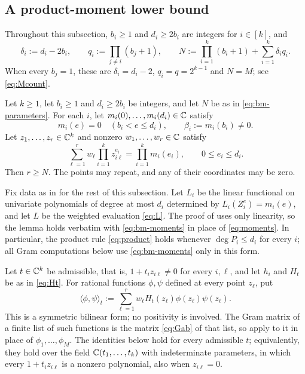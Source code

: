 \subsection{A product-moment lower bound}
Throughout this subsection, $b_i\ge1$ and $d_i\ge2b_i$ are integers
for $i\in[k]$, and
\begin{equation}\label{eq:bm-parameters}
\delta_i:=d_i-2b_i,\qquad
q_i:=\prod_{j\ne i}(b_j+1),\qquad
N:=\prod_{i=1}^k(b_i+1)+\sum_{i=1}^k\delta_iq_i .
\end{equation}
When every $b_j=1$, these are $\delta_i=d_i-2$, $q_i=q=2^{k-1}$ and
$N=M$; see \eqref{eq:Mcount}.

\begin{theorem}\label{thm:pm}
Let $k\ge1$, let $b_i\ge1$ and $d_i\ge2b_i$ be integers, and let $N$
be as in \eqref{eq:bm-parameters}. For each $i$, let
$m_i(0),\ldots,m_i(d_i)\in\mathbb C$ satisfy
\begin{equation}\label{eq:bm-truncation}
m_i(e)=0\quad(b_i<e\le d_i),
\qquad
\beta_i:=m_i(b_i)\ne0 .
\end{equation}
Let $z_1,\ldots,z_r\in\mathbb C^k$ and nonzero $w_1,\ldots,w_r\in\mathbb C$ satisfy
\begin{equation}\label{eq:bm-moments}
\sum_{\ell=1}^r w_\ell\prod_{i=1}^k z_{i\ell}^{e_i}
=\prod_{i=1}^k m_i(e_i),
\qquad 0\le e_i\le d_i .
\end{equation}
Then $r\ge N$. The points may repeat, and any of their coordinates may
be zero.
\end{theorem}

Fix data as in  for the rest of this subsection. Let
$L_i$ be the linear functional on univariate polynomials of degree at
most $d_i$ determined by $L_i(Z_i^e)=m_i(e)$, and let $L$ be the
weighted evaluation \eqref{eq:L}. The proof of 
uses only linearity, so the lemma holds verbatim with
\eqref{eq:bm-moments} in place of \eqref{eq:moments}. In particular,
the product rule \eqref{eq:product} holds whenever $\deg P_i\le d_i$
for every $i$; all Gram computations below use \eqref{eq:bm-moments}
only in this form.

Let $t\in\mathbb C^k$ be admissible, that is, $1+t_iz_{i\ell}\ne0$ for every
$i,\ell$, and let $h_i$ and $H_t$ be as in \eqref{eq:Ht}. For rational
functions $\phi,\psi$ defined at every point $z_\ell$, put
\begin{equation}\label{eq:bm-pairing}
\langle\phi,\psi\rangle_t
:=\sum_{\ell=1}^r w_\ell H_t(z_\ell)\phi(z_\ell)\psi(z_\ell).
\end{equation}
This is a symmetric bilinear form; no positivity is involved. The Gram
matrix of a finite list of such functions is the matrix \eqref{eq:Gab}
of that list, so  apply to it in place of
$\phi_1,\ldots,\phi_M$. The identities below hold for every admissible
$t$; equivalently, they hold over the field $\mathbb C(t_1,\ldots,t_k)$ with
indeterminate parameters, in which every $1+t_iz_{i\ell}$ is a nonzero
polynomial, also when $z_{i\ell}=0$.

